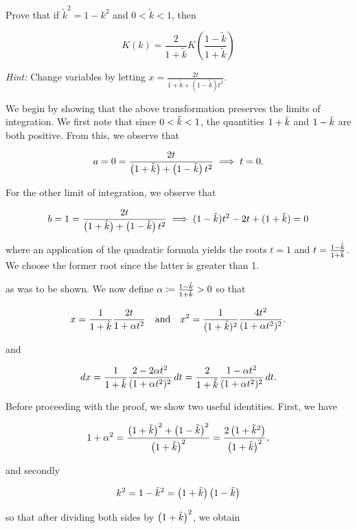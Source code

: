 Prove that if $\tilde{k}^2 = 1 - k^2$ and $0 < \tilde{k} < 1$, then

$$
K(k) = \frac{2}{1 + \tilde{k}} K\left(\frac{1 - \tilde{k}}{1 + \tilde{k}} \right)
$$

\textit{Hint:} Change variables by letting $x = \frac{2t}{1 + \tilde{k} + \left(1 - \tilde{k}\right) t^2}$.

\begin{solution}
  We begin by showing that the above transformation preserves the limits of integration. We first note that since 
  $0 < \tilde{k} < 1$, the quantities $1 + \tilde{k}$ and $1 - \tilde{k}$ are both positive. From this, we observe that

  $$
  a = 0
    = \frac{2t}{\left(1 + \tilde{k}\right) + \left(1 - \tilde{k}\right) t^2}
      \implies t = 0.
  $$

  For the other limit of integration, we observe that

  $$
  b = 1 
    = \frac{2t}{\left(1 + \tilde{k}\right) + \left(1 - \tilde{k}\right) t^2}
      \implies (1 - \tilde{k})t^2 - 2t + (1 + \tilde{k}) = 0
  $$

  where an application of the quadratic formula yields the roots $t = 1$ and $t = \frac{1 - \tilde{k}}{1 + \tilde{k}}$. We choose
  the former root since the latter is greater than 1. 
 
  as was to be shown. We now define $\alpha \coloneqq \frac{1 - \tilde{k}}{1 + \tilde{k}} > 0$ so that 
 
  $$
    x = \frac{1}{1 + \tilde{k}}\frac{2t}{1 + \alpha t^2} \quad \text{and} \quad x^2 = \frac{1}{(1 + \tilde{k})^2}\frac{4t^2}{(1 + \alpha t^2)^2}.
  $$

  and 

  $$
  dx = \frac{1}{1 + \tilde{k}} \frac{2 - 2 \alpha t^2}{(1 + \alpha t^2)^2} \, dt 
     = \frac{2}{1 + \tilde{k}} \frac{1 - \alpha t^2}{(1 + \alpha t^2)^2} \, dt.
  $$

  Before proceeding with the proof, we show two useful identities. First, we have

  \begin{equation} \label{eq:5b-identity-the-first}
    1 + \alpha^2 = \frac{\left(1 + \tilde{k}\right)^2 + \left(1 - \tilde{k}\right)^2}{\left(1 + \tilde{k}\right)^2}
                 = \frac{2\left(1 + \tilde{k}^2\right)}{\left(1 + \tilde{k}\right)^2},
  \end{equation}

  and secondly 

  $$
    k^2 = 1 - \tilde{k}^2 = \left(1 + \tilde{k}\right)\left(1 - \tilde{k}\right)
  $$

  so that after dividing both sides by $\left(1 + \tilde{k}\right)^2$, we obtain


\end{solution}
